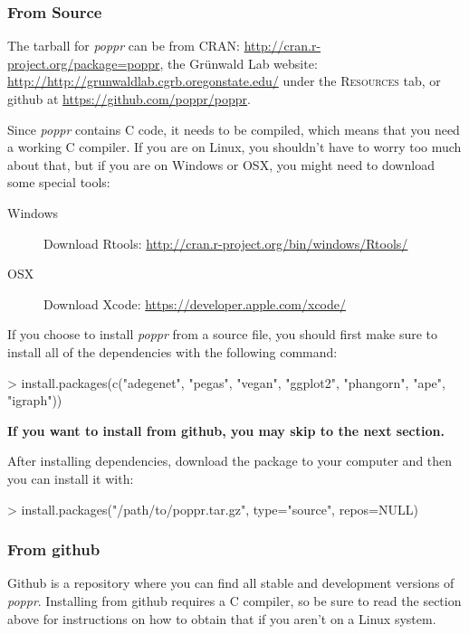 \documentclass[letterpaper]{article}
\newcommand{\tab}{\hspace*{1em}}
\begin{document}
\subsubsection{From Source}
\tab\tab The tarball for \textit{poppr} can be from CRAN: \url{http://cran.r-project.org/package=poppr}, the Gr\"unwald Lab website: \url{http://http://grunwaldlab.cgrb.oregonstate.edu/} under the \textsc{Resources} tab, or github at \url{https://github.com/poppr/poppr}. 

Since \textit{poppr} contains C code, it needs to be compiled, which means that you need a working C compiler. If you are on Linux, you shouldn't have to worry too much about that, but if you are on Windows or OSX, you might need to download some special tools:

\begin{description}
  \item[Windows] Download Rtools: \url{http://cran.r-project.org/bin/windows/Rtools/}
  \item[OSX] Download Xcode: \url{https://developer.apple.com/xcode/}
\end{description}

If you choose to install \textit{poppr} from a source file, you should first make sure to install all of the dependencies with the following command:
\begin{Schunk}
\begin{Sinput}
> install.packages(c("adegenet", "pegas", "vegan", "ggplot2", "phangorn", "ape", "igraph"))
\end{Sinput}
\end{Schunk}
\textbf{If you want to install from github, you may skip to the next section.}

After installing dependencies, download the package to your computer and then you can install it with:
\begin{Schunk}
\begin{Sinput}
> install.packages("/path/to/poppr.tar.gz", type="source", repos=NULL)
\end{Sinput}
\end{Schunk}

\subsubsection{From github}
\tab\tab Github is a repository where you can find all stable and development versions of \textit{poppr}. Installing from github requires a C compiler, so be sure to read the section above for instructions on how to obtain that if you aren't on a Linux system. 
\end{document}
